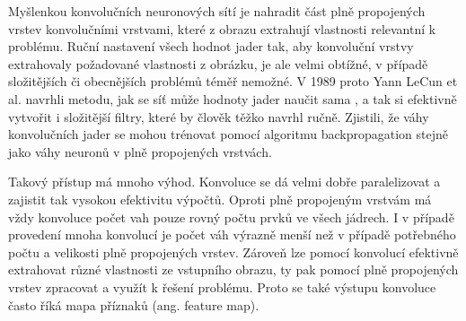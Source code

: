 

Myšlenkou konvolučních neuronových sítí je nahradit část plně propojených
vrstev konvolučními vrstvami, které z obrazu extrahují vlastnosti relevantní k
problému. Ruční nastavení všech hodnot jader tak, aby konvoluční vrstvy
extrahovaly požadované vlastnosti z obrázku, je ale velmi obtížné, v případě
složitějších či obecnějších problémů téměř nemožné. V 1989 proto Yann LeCun et
al. navrhli metodu, jak se síť může hodnoty jader naučit sama \cite{lecun1989},
a tak si efektivně vytvořit i složitější filtry, které by člověk těžko navrhl
ručně. Zjistili, že váhy konvolučních jader se mohou trénovat pomocí algoritmu
backpropagation stejně jako váhy neuronů v plně propojených vrstvách.

Takový přístup má mnoho výhod. Konvoluce se dá velmi dobře paralelizovat a
zajistit tak vysokou efektivitu výpočtů. Oproti plně propojeným vrstvám má vždy
konvoluce počet vah pouze rovný počtu prvků ve všech jádrech. I v případě
provedení mnoha konvolucí je počet váh výrazně menší než v případě potřebného
počtu a velikosti plně propojených vrstev. Zároveň lze pomocí konvolucí
efektivně extrahovat různé vlastnosti ze vstupního obrazu, ty pak pomocí plně
propojených vrstev zpracovat a využít k řešení problému. Proto se také výstupu
konvoluce často říká mapa příznaků (ang. feature map).


